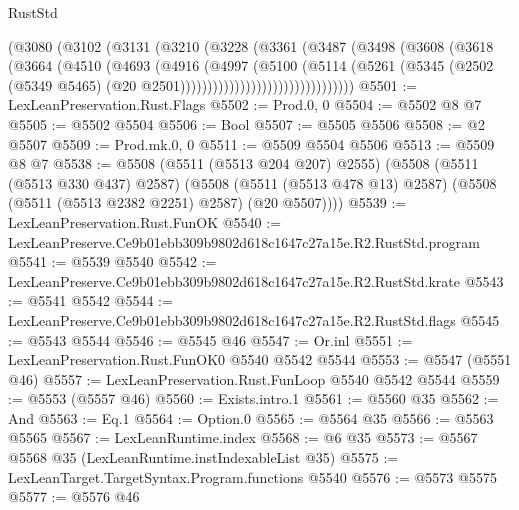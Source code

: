 \begin{lexlean}{RustStd}
\begin{coremodule}
                          (@3080
                            (@3102
                              (@3131
                                (@3210
                                  (@3228
                                    (@3361
                                      (@3487
                                        (@3498
                                          (@3608
                                            (@3618
                                              (@3664
                                                (@4510
                                                  (@4693
                                                    (@4916
                                                      (@4997
                                                        (@5100
                                                          (@5114
                                                            (@5261
                                                              (@5345
                                                                (@2502
                                                                  (@5349 @5465)
                                                                  (@20
                                                                    @2501))))))))))))))))))))))))))))))))
@5501 := LexLeanPreservation.Rust.Flags
@5502 := Prod.{0, 0}
@5504 := @5502 @8 @7
@5505 := @5502 @5504
@5506 := Bool
@5507 := @5505 @5506
@5508 := @2 @5507
@5509 := Prod.mk.{0, 0}
@5511 := @5509 @5504 @5506
@5513 := @5509 @8 @7
@5538 := @5508
    (@5511 (@5513 @204 @207) @2555)
    (@5508
      (@5511 (@5513 @330 @437) @2587)
      (@5508 (@5511 (@5513 @478 @13) @2587) (@5508 (@5511 (@5513 @2382 @2251) @2587) (@20 @5507))))
@5539 := LexLeanPreservation.Rust.FunOK
@5540 := LexLeanPreserve.Ce9b01ebb309b9802d618c1647c27a15e.R2.RustStd.program
@5541 := @5539 @5540
@5542 := LexLeanPreserve.Ce9b01ebb309b9802d618c1647c27a15e.R2.RustStd.krate
@5543 := @5541 @5542
@5544 := LexLeanPreserve.Ce9b01ebb309b9802d618c1647c27a15e.R2.RustStd.flags
@5545 := @5543 @5544
@5546 := @5545 @46
@5547 := Or.inl
@5551 := LexLeanPreservation.Rust.FunOK0 @5540 @5542 @5544
@5553 := @5547 (@5551 @46)
@5557 := LexLeanPreservation.Rust.FunLoop @5540 @5542 @5544
@5559 := @5553 (@5557 @46)
@5560 := Exists.intro.{1}
@5561 := @5560 @35
@5562 := And
@5563 := Eq.{1}
@5564 := Option.{0}
@5565 := @5564 @35
@5566 := @5563 @5565
@5567 := LexLeanRuntime.index
@5568 := @6 @35
@5573 := @5567 @5568 @35 (LexLeanRuntime.instIndexableList @35)
@5575 := LexLeanTarget.TargetSyntax.Program.functions @5540
@5576 := @5573 @5575
@5577 := @5576 @46

\end{coremodule}
\end{lexlean}
